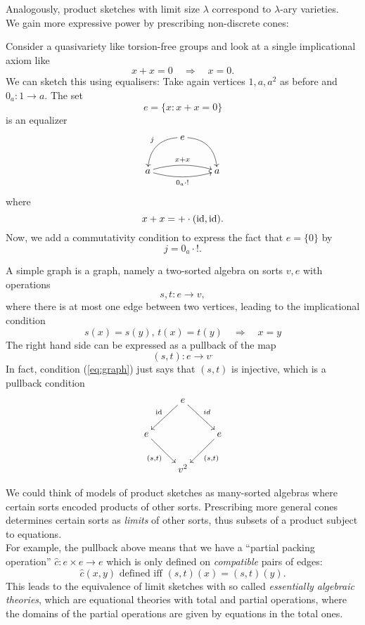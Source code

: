 Analogously, product sketches with limit size $\lambda$ correspond to $\lambda$-ary varieties. \\

We gain more expressive power by prescribing non-discrete cones:

\begin{Example}
Consider a quasivariety like torsion-free groups and look at a single implicational axiom like
\[ x + x = 0 \quad \Rightarrow \quad x = 0. \]
We can sketch this using equalisers: Take again vertices $1,a,a^2$ as before and $0_a : 1 \to a$. The set
\[ e = \{ x : x + x = 0 \} \]
is an equalizer
\[
\xymatrix{
& e \ar@/_1pc/[ld]_{j} \ar@/^1pc/[rd] & \\
a \ar@/^/[rr]^{x + x} \ar@/_/[rr]_{0_a \circ !} & & a
}\]
where \[ x + x = + \cdot (\textrm{id},\textrm{id}). \]
Now, we add a commutativity condition to express the fact that $e = \{0\}$ by \[ j = 0_a\cdot !. \]
\end{Example}

\begin{Example}
A simple graph is a graph, namely a two-sorted algebra on sorts $v,e$ with operations
\[ s, t : e \to v, \]
where there is at most one edge between two vertices, leading to the implicational condition
\begin{equation}\label{eq:graph} s(x) = s(y),\, t(x) = t(y) \quad \Rightarrow \quad x = y \end{equation}
The right hand side can be expressed as a pullback of the map \[ (s,t) : e \to v^. \]
In fact, condition (\ref{eq:graph}) just says that $(s,t)$ is injective, which is a pullback condition
\[
\xymatrix{
 & e \ar[ld]_{\id} \ar[rd]^{id} & \\
e \ar[rd]_{(s,t)} &  & e \ar[ld]^{(s,t)} \\
 & v^2 &
}\]
\end{Example}

We could think of models of product sketches as many-sorted algebras where certain sorts encoded products of other sorts. Prescribing more general cones determines certain sorts as \emph{limits} of other sorts, thus subsets of a product subject to equations. \\

For example, the pullback above means that we have a ``partial packing operation'' $\hat c : e \times e \to e$ which is only defined on \emph{compatible} pairs of edges:
\[ \hat c(x,y) \text{ defined iff } (s,t)(x) = (s,t)(y). \]
This leads to the equivalence of limit sketches with so called \emph{essentially algebraic theories}, which are equational theories with total and partial operations, where the domains of the partial operations are given by equations in the total ones. \cite[Chapter 3.D]{AdamekRosicky} \\

